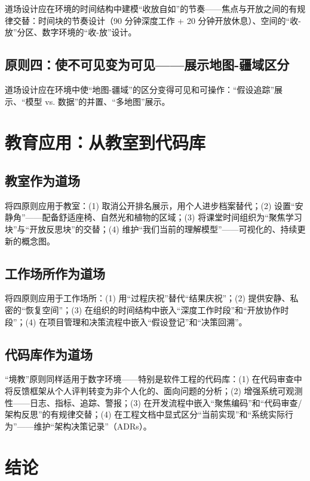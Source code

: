 \documentclass[UTF8,12pt,a4paper]{ctexart}
\begin{document}
道场设计应在环境的时间结构中建模``收放自如''的节奏——焦点与开放之间的有规律交替：时间块的节奏设计（90 分钟深度工作 + 20 分钟开放休息）、空间的``收-放''分区、数字环境的``收-放''设计。

\subsection{原则四：使不可见变为可见——展示地图-疆域区分}

道场设计应在环境中使``地图-疆域''的区分变得可见和可操作：``假设追踪''展示、``模型 vs. 数据''的并置、``多地图''展示。

\section{教育应用：从教室到代码库}

\subsection{教室作为道场}

将四原则应用于教室：(1) 取消公开排名展示，用个人进步档案替代；(2) 设置``安静角''——配备舒适座椅、自然光和植物的区域；(3) 将课堂时间组织为``聚焦学习块''与``开放反思块''的交替；(4) 维护``我们当前的理解模型''——可视化的、持续更新的概念图。

\subsection{工作场所作为道场}

将四原则应用于工作场所：(1) 用``过程庆祝''替代``结果庆祝''；(2) 提供安静、私密的``恢复空间''；(3) 在组织的时间结构中嵌入``深度工作时段''和``开放协作时段''；(4) 在项目管理和决策流程中嵌入``假设登记''和``决策回溯''。

\subsection{代码库作为道场}

``境教''原则同样适用于数字环境——特别是软件工程的代码库：(1) 在代码审查中将反馈框架从个人评判转变为非个人化的、面向问题的分析；(2) 增强系统可观测性——日志、指标、追踪、警报；(3) 在开发流程中嵌入``聚焦编码''和``代码审查/架构反思''的有规律交替；(4) 在工程文档中显式区分``当前实现''和``系统实际行为''——维护``架构决策记录''（ADRs）。

\section{结论}
\end{document}
